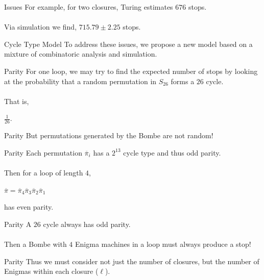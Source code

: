 \documentclass[hyphens,aspectratio=169]{beamer}
\begin{document}
\begin{frame}[fragile]{Issues}
	For example, for two closures, Turing estimates $676$ stops.
	\\\\Via simulation we find, $715.79\pm2.25$ stops.
\end{frame}

\begin{frame}[fragile]{Cycle Type Model}
	To address these issues, we propose a new model based on a mixture of combinatoric analysis and simulation.
\end{frame}

\begin{frame}[fragile]{Parity}
	For one loop, we may try to find the expected number of stops by looking at the probability that a random permutation in $S_{26}$ forms a $26$ cycle.
	\\\\That is, \begin{center}
		$\frac{1}{26}$.
	\end{center}
\end{frame}

\begin{frame}[fragile]{Parity}
	\large
	But permutations generated by the Bombe are not random!
\end{frame}

\begin{frame}[fragile]{Parity}
	Each permutation $\overline\pi_i$ has a
	$2^{13}$ cycle type and thus odd parity.
	\\\\Then for a loop of length $4$,
	\begin{center}
		$\overline\pi = \overline\pi_4\overline\pi_3\overline\pi_2\overline\pi_1$
	\end{center}
	has even parity.
\end{frame}

\begin{frame}[fragile]{Parity}
	\large
	A $26$ cycle always has odd parity.
	\\\\Then a Bombe with $4$ Enigma machines in a loop must always produce a stop!
\end{frame}

\begin{frame}[fragile]{Parity}
	\large
	Thus we must consider not just the number of closures, but the number of Enigmas within each closure ($\ell$).
\end{frame}
\end{document}
